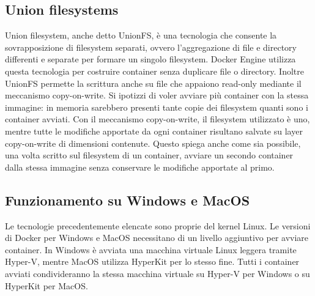 \subsection{Union filesystems}
Union filesystem, anche detto UnionFS, è una tecnologia che consente la sovrapposizione di filesystem separati, ovvero l'aggregazione di file e directory differenti e separate per formare un singolo filesystem. Docker Engine utilizza questa tecnologia per costruire container senza duplicare file o directory. Inoltre UnionFS permette la scrittura anche su file che appaiono read-only mediante il meccanismo copy-on-write. Si ipotizzi di voler avviare più container con la stessa immagine: in memoria sarebbero presenti tante copie dei filesystem quanti sono i container avviati. Con il meccanismo copy-on-write, il filesystem utilizzato è uno, mentre tutte le modifiche apportate da ogni container risultano salvate su layer copy-on-write di dimensioni contenute. Questo spiega anche come sia possibile, una volta scritto sul filesystem di un container, avviare un secondo container dalla stessa immagine senza conservare le modifiche apportate al primo.

\subsection{Funzionamento su Windows e MacOS}
Le tecnologie precedentemente elencate sono proprie del kernel Linux. Le versioni di Docker per Windows e MacOS necessitano di un livello aggiuntivo per avviare container. In Windows è avviata una macchina virtuale Linux leggera tramite Hyper-V, mentre MacOS utilizza HyperKit per lo stesso fine. Tutti i container avviati condivideranno la stessa macchina virtuale su Hyper-V per Windows o su HyperKit per MacOS.

